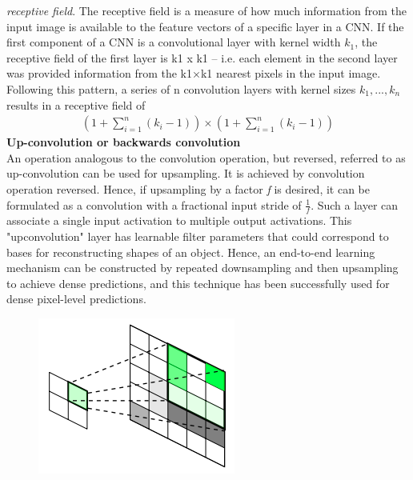 \begin{enumerate}
                    \emph{receptive field}. The receptive field is a measure of how much information from the
                    input image is available to the feature vectors of a specific layer in a CNN. If the
                    first component of a CNN is a convolutional layer with kernel width \emph{$k_1$}, the receptive
                    field of the first layer is k1 x k1 – i.e. each element in the second layer was provided
                    information from the k1×k1 nearest pixels in the input image. Following this pattern,
                    a series of n convolution layers with kernel sizes \emph{$k_1, . . . , k_n$} results in a receptive field
                    of
                    \begin{align}
                        (1 + \displaystyle\sum_{i=1}^n (k_i - 1)) \times (1 + \displaystyle\sum_{i=1}^n (k_i - 1))
                    \end{align}
                    \textbf{Up-convolution or backwards convolution} \\ 
                    \vspace{3mm}
                    An operation analogous to the convolution operation, but reversed, referred to as
                    up-convolution can be used for upsampling. It is achieved by convolution operation
                    reversed. Hence, if upsampling by a factor \emph{f} is desired, it
                    can be formulated as a convolution with a fractional input stride of $\frac{1}{f}$. Such 
                    a layer can associate a single input activation to multiple output activations. This "upconvolution" layer has learnable filter parameters that could correspond to bases
                    for reconstructing shapes of an object. Hence, an end-to-end learning mechanism can be constructed by repeated downsampling and then upsampling to achieve
                    dense predictions, and this technique has been successfully used for dense pixel-level
                    predictions.
                    \begin{figure}[H]
                        \centering
                        \includegraphics[width=0.4\linewidth]{img/up-convolution.png}

\end{figure}
\end{enumerate}
